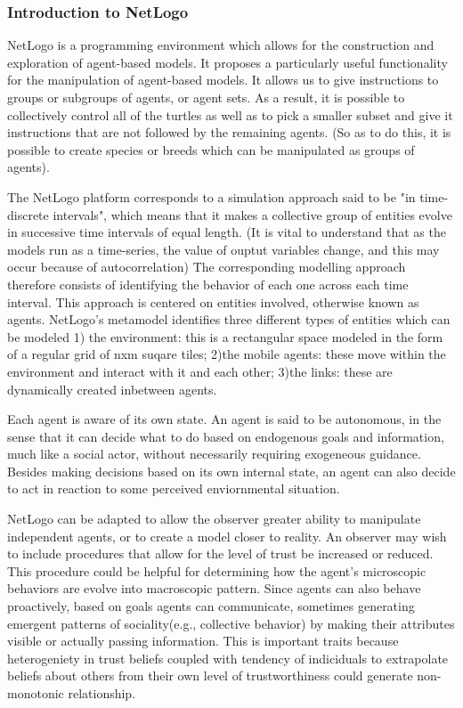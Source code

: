 \documentclass[11pt]{article}
\begin{document}
\subsubsection{Introduction to NetLogo}

NetLogo is a programming environment which allows for the construction and exploration of agent-based models. It proposes a particularly useful functionality for the manipulation of agent-based models. It allows us to give instructions to groups or subgroups of agents, or agent sets. As a result, it is possible to collectively control all of the turtles as well as to pick a smaller subset and give it instructions that are not followed by the remaining agents. (So as to do this, it is possible to create species or breeds which can be manipulated as groups of agents).

The NetLogo platform corresponds to a simulation approach said to be "in time-discrete intervals", which means that it makes a collective group of entities evolve in successive time intervals of equal length. (It is vital to understand that as the models run as a time-series, the value of ouptut variables change, and this may occur because of autocorrelation) The corresponding modelling approach therefore consists of identifying the behavior of each one across each time interval. This approach is centered on entities involved, otherwise known as agents. NetLogo's metamodel identifies three different types of entities which can be modeled 1) the environment: this is a rectangular space modeled in the form of a regular grid of nxm suqare tiles; 2)the mobile agents: these move within the environment and interact with it and each other; 3)the links: these are dynamically created inbetween agents.

Each agent is aware of its own state. An agent is said to be autonomous, in the sense that it can decide what to do based on endogenous goals and information, much like a social actor, without necessarily requiring exogeneous guidance. Besides making decisions based on its own internal state, an agent can also decide to act in reaction to some perceived enviornmental situation. 

NetLogo can be adapted to allow the observer greater ability to manipulate independent agents, or to create a model closer to reality. An observer may wish to include procedures that allow for the level of trust be increased or reduced. This procedure could be helpful for determining how the agent's microscopic behaviors are evolve into macroscopic pattern. Since agents can also behave proactively, based on goals agents can communicate, sometimes generating emergent patterns of sociality(e.g., collective behavior) by making their attributes visible or actually passing information. This is important traits because heterogeniety in trust beliefs coupled with tendency of indiciduals to extrapolate beliefs about others from their own level of trustworthiness could generate non-monotonic relationship.
\end{document}
